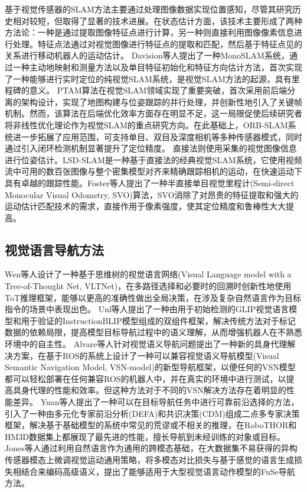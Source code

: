 	基于视觉传感器的SLAM方法主要通过处理图像数据实现位置感知，尽管其研究历史相对较短，但取得了显著的技术进展。在状态估计方面，该技术主要形成了两种方法论：一种是通过提取图像特征点进行计算，另一种则直接利用图像像素信息进行处理。特征点法通过对视觉图像进行特征点的提取和匹配，然后基于特征点见的关系进行移动机器人的运动估计。
	Davision\cite{davison2007monoslam, davison2003real}等人提出了一种MonoSLAM系统，通过一种主动地映射和测量方法以及单目特征初始化和特征方向估计方法，首次实现了一种能够进行实时定位的纯视觉SLAM系统，是视觉SLAM方法的起源，具有里程碑的意义。
	PTAM\cite{klein2007parallel}算法在视觉SLAM领域实现了重要突破，首次采用前后端分离的架构设计，实现了地图构建与位姿跟踪的并行处理，并创新性地引入了关键帧机制。然而，该算法在后端优化效率方面存在明显不足，这一局限促使后续研究者将非线性优化理论作为视觉SLAM的重点研究方向。在此基础上，ORB-SLAM\cite{mur2015orb}系统进一步拓展了应用范围，可支持单目、双目及深度相机等多种传感器模式，同时通过引入闭环检测机制显著提升了定位精度。
	直接法则使用采集的视觉图像信息进行位姿估计。LSD-SLAM\cite{newcombe2011dtam}是一种基于直接法的经典视觉SLAM系统，它使用视频流中可用的数百张图像与整个密集模型对齐来精确跟踪相机的运动，在快速运动下具有卓越的跟踪性能。Foster\cite{forster2014svo}等人提出了一种半直接单目视觉里程计(Semi-direct Monocular Visual Odometry, SVO)算法，SVO消除了对昂贵的特征提取和强大的运动估计匹配技术的需求，直接作用于像素强度，使其定位精度和鲁棒性大大提高。


	



\subsection{视觉语言导航方法}
	Wen\cite{wen2025zero}等人设计了一种基于思维树的视觉语言网络(Visual Language model with a Tree-of-Thought Net, VLTNet)，在多路径选择和必要时的回溯时创新性地使用ToT推理框架，能够以更高的准确性做出全局决策，在涉及复杂自然语言作为目标指令的场景中表现出色。
	Unl\cite{unlu2025reliable}等人提出了一种由用于初始检测的GLIP视觉语言模型和用于验证的InstructionBLIP模型组成的双组件框架，解决传统方法对于标记数据的依赖局限，提高模型目标导航过程中的语义理解，从而增强机器人在不熟悉环境中的自主性。
	Alvare\cite{gutierrez2025visual}等人针对视觉语义导航问题提出了一种新的具身代理解决方案，在基于ROS的系统上设计了一种可以兼容视觉语义导航模型(Visual Semantic Navigation Model, VSN-model)的新型导航框架，以便任何的VSN模型都可以轻松部署在任何兼容ROS的机器人中，并在真实的环境中进行测试，以提高具身代理的性能和效率。但这种方法对于不同的VSN解决方法存在着明显的性能差异。
	Yuan\cite{yuan2025exploring}等人提出了一种可以在目标导航任务中进行可靠前沿选择的方法，引入了一种由多元化专家前沿分析(DEFA)和共识决策(CDM)组成二点多专家决策框架，解决基于基础模型的系统中常见的荒谬或不相关的推理，在RoboTHOR和HM3D数据集上都展现了最先进的性能，擅长导航到未经训练的对象或目标。
	Jones\cite{jones2025beyond}等人通过利用自然语言作为通用的跨模态基础，在大数据集不易获得的异构传感器模态上微调视觉运动通用策略，将多模态对比损失与基于感觉的语言生成损失相结合来编码高级语义，提出了能够适用于大型视觉语言动作模型的FuSe导航方法。

